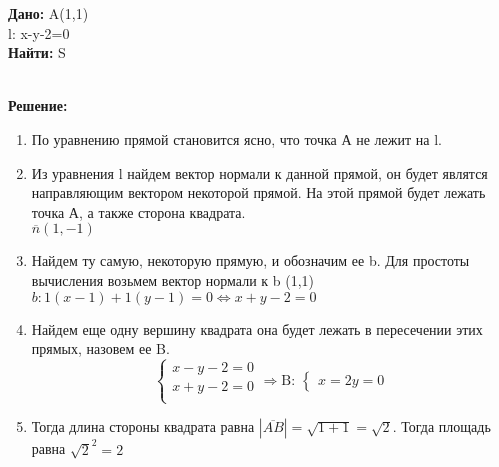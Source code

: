 \documentclass{article}
\begin{document}
\begin{minipage}[t]{0.45\textwidth}
   
\textbf{Дано:}
A(1,1)\\ 
l: x-y-2=0\\ 
\textbf{Найти: } S\\
\end{minipage}
\begin{minipage}[t]{0.45\textwidth}
	\vspace{-\baselineskip} %

\begin{center}
\end{center}
\end{minipage}
\\
\textbf{Решение:}
\begin{enumerate}
  \item По уравнению прямой становится ясно, что 
    точка А не лежит на l.
  \item Из уравнения l найдем вектор нормали к данной прямой,
    он будет являтся направляющим вектором некоторой прямой. На этой прямой
    будет лежать точка А, а также сторона квадрата. \\ 
    $\overline{n}(1,-1)$
  \item Найдем ту самую, некоторую прямую, и обозначим ее b. 
    Для простоты вычисления возьмем вектор нормали к b (1,1)\\ 
  $b: 1(x-1) + 1(y-1) =0 \Leftrightarrow x+y-2 = 0$
\item Найдем еще одну вершину квадрата она будет лежать в
  пересечении этих прямых, назовем ее B.  
  \[
  \begin{cases}
    x-y-2=0\\ 
    x+y-2 = 0\\ 
  \end{cases}
  \Rightarrow \text{B: }
\begin{cases}
  x = 2 
  y = 0 
\end{cases}
  \]
\item Тогда длина стороны квадрата равна $|\overline{AB}| = \sqrt{1+1} = \sqrt{2}$. 
  Тогда площадь равна $\sqrt{2}^2 = 2$ 
  
\end{enumerate}
\end{document}
